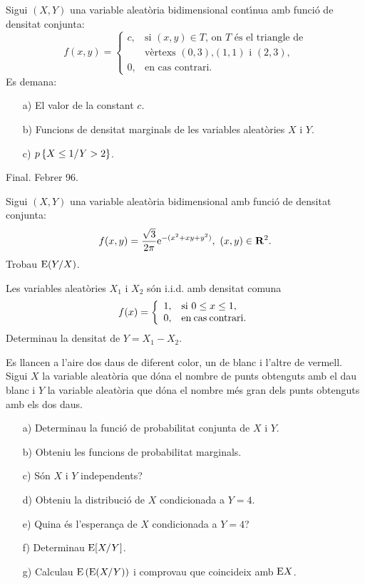 \begin{prob}
{
Sigui $(X,Y)$ una variable aleat\`oria bidimensional cont\'{\i}nua
amb funci\'o de densitat conjunta:
\[
f(x,y)=
\left\{
\begin{array}{ll}
c, & \mbox{si $(x,y)\in T$, on $T$ \'es el triangle de} \\
 & \mbox{
v\`ertexs $(0,3)$,
$(1,1)$ i $(2,3)$,}\\
0, & \mbox{en cas contrari.}
\end{array}
\right.
\]
Es demana:
\begin{itemize}
\item[a)] El valor de la constant $c$.
\item[b)] Funcions de densitat marginals de les variables aleat\`ories
$X$ i $Y$.
\item[c)] $p\left\{ X\leq 1 / Y>2\right\}$.
\end{itemize}
{\footnotesize Final. Febrer 96.}
}
\end{prob}

\begin{prob}
{
Sigui $(X,Y)$ una variable aleat\`oria bidimensional
amb funci\'o de densitat conjunta:
\[
f(x,y)=\frac{\sqrt{3}}{2\pi} {\rm e}^{-(x^2+xy+y^2)},\ (x,y)\in{\bf R}^2.
\]
Trobau ${\rm E} (Y/X)$.
}
\end{prob}

\begin{prob}
{Les variables aleat\`ories $X_1$ i $X_2$ s\'on i.i.d. amb densitat comuna
$$
f(x) = \left\{ \begin{array}{ll} 1, & {\rm si } \ 0 \leq x \leq 1,\\ 
0, & {\rm en \> cas \> contrari}.
\end{array} \right.
$$
Determinau la densitat de $Y=X_1 - X_2$.
}
\end{prob}

\begin{prob}
{Es llancen a l'aire dos daus de diferent color, un de blanc i l'altre 
de vermell. Sigui $X$ la variable aleat\`oria que d\'ona el nombre de punts 
obtenguts amb el dau blanc i $Y$ la variable aleat\`oria que d\'ona el 
nombre m\'es gran dels punts obtenguts amb els dos daus.

\begin{itemize}
\item[a)] Determinau la funci\'o de probabilitat conjunta de $X$ i $Y$.
\item[b)] Obteniu les funcions de probabilitat marginals.
\item[c)] S\'on $X$ i $Y$ independents?
\item[d)] Obteniu la distribuci\'o de $X$ condicionada a $Y=4$.
\item[e)] Quina \'es l'esperan\c{c}a de $X$ condicionada a $Y=4$?
\item[f)] Determinau ${\rm E} [X/Y]$.
\item[g)] Calculau ${\rm E} \left( {\rm E} (X/Y) \right)$ i comprovau que 
coincideix amb ${\rm E} X$.
\end{itemize}
}
\end{prob}

